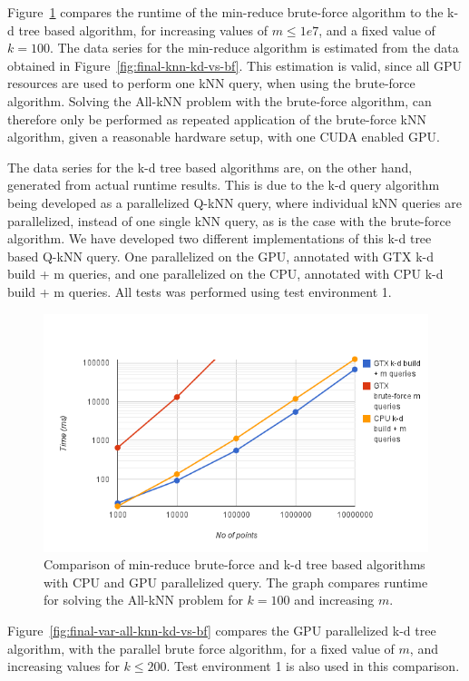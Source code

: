 Figure~\ref{fig:final-all-knn-gpu-vs-cpu-vs-bf} compares the runtime of the min-reduce brute-force algorithm to the k-d tree based algorithm, for increasing values of $m\le1e7$, and a fixed value of $k=100$. The data series for the min-reduce algorithm is estimated from the data obtained in Figure~\ref{fig:final-knn-kd-vs-bf}. This estimation is valid, since all GPU resources are used to perform one kNN query, when using the brute-force algorithm. Solving the All-kNN problem with the brute-force algorithm, can therefore only be performed as repeated application of the brute-force kNN algorithm, given a reasonable hardware setup, with one CUDA enabled GPU.

The data series for the k-d tree based algorithms are, on the other hand, generated from actual runtime results. This is due to the k-d query algorithm being developed as a parallelized Q-kNN query, where individual kNN queries are parallelized, instead of one single kNN query, as is the case with the brute-force algorithm. We have developed two different implementations of this k-d tree based Q-kNN query. One parallelized on the GPU, annotated with GTX k-d build + m queries, and one parallelized on the CPU, annotated with CPU k-d build + m queries. All tests was performed using test environment 1.

\begin{figure}[ht!]
    \centering
    \includegraphics[width=120mm]{../gfx/final-all-knn-gpu-vs-cpu-vs-bf.png}
    \caption{Comparison of min-reduce brute-force and k-d tree based algorithms with CPU and GPU parallelized query. The graph compares runtime for solving the All-kNN problem for $k=100$ and increasing $m$.}
    \label{fig:final-all-knn-gpu-vs-cpu-vs-bf}
\end{figure}

Figure~\ref{fig:final-var-all-knn-kd-vs-bf} compares the GPU parallelized k-d tree algorithm, with the parallel brute force algorithm, for a fixed value of $m$, and increasing values for $k\le200$. Test environment 1 is also used in this comparison.

